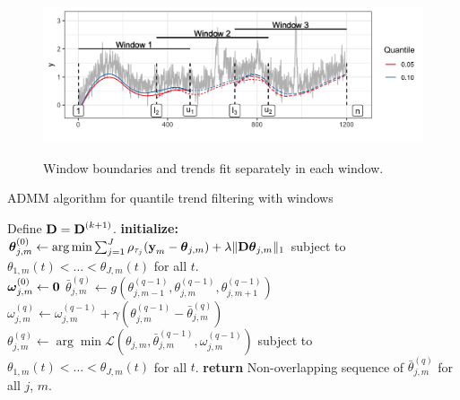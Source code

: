 \documentclass[12pt]{article}
\newcommand{\V}[1]{{\bm{\mathbf{\MakeLowercase{#1}}}}} %
\newcommand{\Vn}[2]{\V{#1}^{(#2)}} %
\newcommand{\M}[1]{{\bm{\mathbf{\MakeUppercase{#1}}}}} %
\newcommand{\Mn}[2]{\M{#1}^{(#2)}} %
\begin{document}
	\begin{figure}[!h] 
		\centering
		\caption{Window boundaries and trends fit separately in each window.}
		\includegraphics[width = 0.8\linewidth]{Figures/overlapping_windows.png}
		\label{fig:windows}
	\end{figure}

	\begin{algorithm}
		\caption{ADMM algorithm for quantile trend filtering with windows}\label{euclid}
		\begin{algorithmic}		
			\State Define $\M{D} = \Mn{D}{k+1}$. 
			\State \textbf{initialize:} \\
				 $\Vn{\theta}{0}_{j,m} \gets \arg \min \sum_{j=1}^J\rho_{\tau_j}(\V{y}_m - \V{\theta}_{j,m})+\lambda \lVert \M{D}\V{\theta}_{j,m}\rVert_1$ subject to $\theta_{1,m}(t) < \ldots<\theta_{J,m}(t)$ for all $t$. \\		
			 	 $\Vn{\omega}{0}_{j,m} \gets \V{0}$	
			\Repeat{}
			\State  		
			$\bar{\theta}_{j,m}^{(q)} \gets g(\theta_{j, m-1}^{(q-1)}, \theta_{j,m}^{(q-1)}, \theta_{j,m+1}^{(q-1)})$
			\State 
			$\omega_{j,m}^{(q)} \gets \omega_{j,m}^{(q-1)} + \gamma(\theta_{j,m}^{(q-1)} - \bar{\theta}_{j,m}^{(q)})$	
			\State
				$\theta_{j,m}^{(q)} \gets \arg\min \mathcal{L}(\theta_{j,m}, \bar{\theta}_{j,m}^{(q-1)}, \omega_{j,m}^{(q-1)})$			
			 subject to $\theta_{1,m}(t) < \ldots<\theta_{J,m}(t)$ for all $t$.
			\State \textbf{return} Non-overlapping sequence of $\bar{\theta}_{j,m}^{(q)}$ for all $j$, $m$.
			
		\end{algorithmic}
	\end{algorithm}
\end{document}

